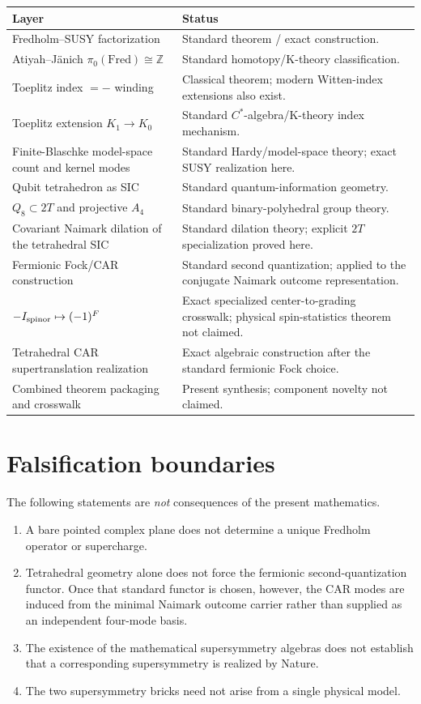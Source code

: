 \begin{center}
\begin{tabular}{p{}p{}}
\toprule
\textbf{Layer} & \textbf{Status}\\
\midrule
Fredholm--SUSY factorization & Standard theorem / exact construction.\\
Atiyah--J\"anich $\pi_0(\mathrm{Fred})\cong\mathbb Z$ & Standard homotopy/K-theory classification.\\
Toeplitz index $=-$ winding & Classical theorem; modern Witten-index extensions also exist.\\
Toeplitz extension $K_1\to K_0$ & Standard $C^*$-algebra/K-theory index mechanism.\\
Finite-Blaschke model-space count and kernel modes & Standard Hardy/model-space theory; exact SUSY realization here.\\
Qubit tetrahedron as SIC & Standard quantum-information geometry.\\
$Q_8\subset2T$ and projective $A_4$ & Standard binary-polyhedral group theory.\\
Covariant Naimark dilation of the tetrahedral SIC & Standard dilation theory; explicit $2T$ specialization proved here.\\
Fermionic Fock/CAR construction & Standard second quantization; applied to the conjugate Naimark outcome representation.\\
$-I_{\rm spinor}\mapsto(-1)^F$ & Exact specialized center-to-grading crosswalk; physical spin-statistics theorem not claimed.\\
Tetrahedral CAR supertranslation realization & Exact algebraic construction after the standard fermionic Fock choice.\\
Combined theorem packaging and crosswalk & Present synthesis; component novelty not claimed.\\
\bottomrule
\end{tabular}
\end{center}

\section{Falsification boundaries}

The following statements are \emph{not} consequences of the present mathematics.

\begin{enumerate}[label=\textbf{F\arabic*.}]
\item A bare pointed complex plane does not determine a unique Fredholm operator or supercharge.
\item Tetrahedral geometry alone does not force the fermionic second-quantization functor. Once that standard functor is chosen, however, the CAR modes are induced from the minimal Naimark outcome carrier rather than supplied as an independent four-mode basis.
\item The existence of the mathematical supersymmetry algebras does not establish that a corresponding supersymmetry is realized by Nature.
\item The two supersymmetry bricks need not arise from a single physical model.
\end{enumerate}

